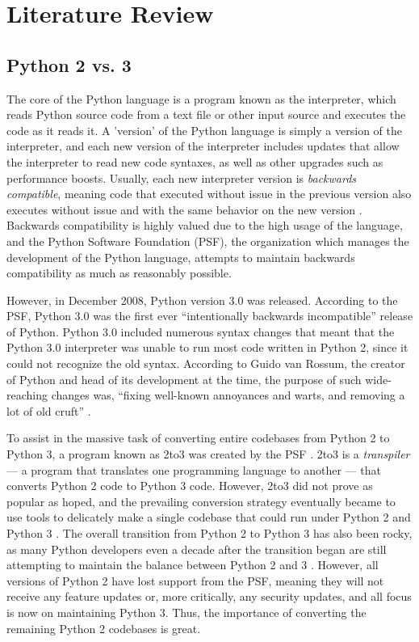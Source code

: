 \section{Literature Review}

\subsection{Python 2 vs. 3}
The core of the Python language is a program known as the interpreter, which reads Python source code from a text file or other input source and executes the code as it reads it. A 'version' of the Python language is simply a version of the interpreter, and each new version of the interpreter includes updates that allow the interpreter to read new code syntaxes, as well as other upgrades such as performance boosts. Usually, each new interpreter version is \textit{backwards compatible}, meaning code that executed without issue in the previous version also executes without issue and with the same behavior on the new version \autocite{Malloy}. Backwards compatibility is highly valued due to the high usage of the language, and the Python Software Foundation (PSF), the organization which manages the development of the Python language, attempts to maintain backwards compatibility as much as reasonably possible.

However, in December 2008, Python version 3.0 was released. According to the PSF, Python 3.0 was the first ever “intentionally backwards incompatible” release of Python. Python 3.0 included numerous syntax changes that meant that the Python 3.0 interpreter was unable to run most code written in Python 2, since it could not recognize the old syntax. According to Guido van Rossum, the creator of Python and head of its development at the time, the purpose of such wide-reaching changes was, “fixing well-known annoyances and warts, and removing a lot of old cruft” \autocite{vanRossum}.

To assist in the massive task of converting entire codebases from Python 2 to Python 3, a program known as 2to3 was created by the PSF \autocite{2to3}. 2to3 is a \textit{transpiler} --- a program that translates one programming language to another --- that converts Python 2 code to Python 3 code. However, 2to3 did not prove as popular as hoped, and the prevailing conversion strategy eventually became to use tools to delicately make a single codebase that could run under Python 2 and Python 3 \autocite{Malloy}. The overall transition from Python 2 to Python 3 has also been rocky, as many Python developers even a decade after the transition began are still attempting to maintain the balance between Python 2 and 3 \autocite{Malloy}. However, all versions of Python 2 have lost support from the PSF, meaning they will not receive any feature updates or, more critically, any security updates, and all focus is now on maintaining Python 3. Thus, the importance of converting the remaining Python 2 codebases is great.


